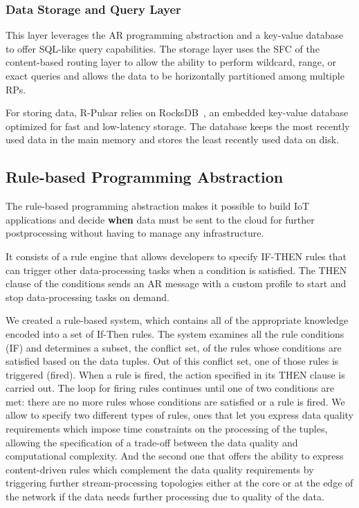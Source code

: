 \subsubsection{Data Storage and Query Layer}

This layer leverages the AR programming abstraction and a key-value database to offer SQL-like query capabilities. The storage layer uses the SFC of the content-based routing layer to allow the ability to perform wildcard, range, or exact queries and allows the data to be horizontally partitioned among multiple RPs. 

For storing data, R-Pulsar relies on RocksDB~\cite{rocks}, an embedded key-value database optimized for fast and low-latency storage. The database keeps the most recently used data in the main memory and stores the least recently used data on disk.

\subsection{Rule-based Programming Abstraction}\label{sec:programming-data}
The rule-based programming abstraction makes it possible to build IoT applications and decide \textbf{when} data must be sent to the cloud for further postprocessing without having to manage any infrastructure.

It consists of a rule engine that allows developers to specify IF-THEN rules that can trigger other data-processing tasks when a condition is satisfied. The THEN clause of the conditions sends an AR message with a custom profile to start and stop data-processing tasks on demand. %

We created a rule-based system, which contains all of the appropriate knowledge encoded into a set of If-Then rules. The system examines all the rule conditions (IF) and determines a subset, the conflict set, of the rules whose conditions are satisfied based on the data tuples. Out of this conflict set, one of those rules is triggered (fired). When a rule is fired, the action specified in its THEN clause is carried out. The loop for firing rules continues until one of two conditions are met: there are no more rules whose conditions are satisfied or a rule is fired. We allow to specify two different types of rules, ones that let you express data quality requirements which impose time constraints on the processing of the tuples, allowing the specification of a trade-off between the data quality and computational complexity. And the second one that offers the ability to express content-driven rules which complement the data quality requirements by triggering further stream-processing topologies either at the core or at the edge of the network if the data needs further processing due to quality of the data.

